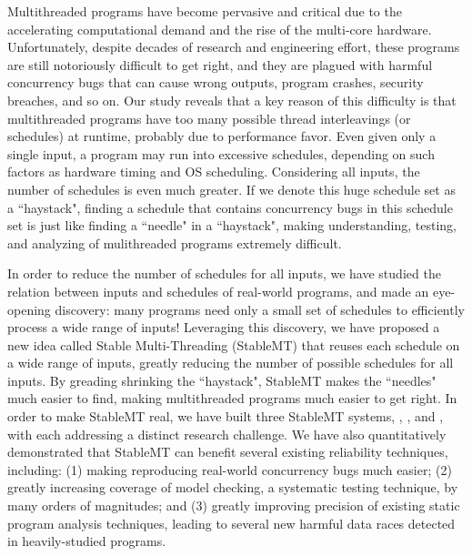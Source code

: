 Multithreaded programs have become pervasive and critical due to the
accelerating computational demand and the rise of the multi-core hardware.
Unfortunately, despite decades of research and engineering effort, these
programs are still notoriously difficult to get right, and they are plagued with
harmful concurrency bugs that can cause wrong outputs, program crashes, security
breaches, and so on. Our study reveals that a key reason of this difficulty is
that multithreaded programs have too many possible thread interleavings (or
schedules) at runtime, probably due to performance favor. Even given only a
single input, a program may run into excessive schedules, depending on such
factors as hardware timing and OS scheduling. Considering all inputs, the number
of schedules is even much greater. If we denote this huge schedule set as a
``haystack", finding a schedule that contains concurrency bugs in this schedule
set is just like finding a ``needle" in a ``haystack", making understanding,
testing, and analyzing of mulithreaded programs extremely difficult.

In order to reduce the number of schedules for all inputs, we have studied the
relation between inputs and schedules of real-world programs, and made an
eye-opening discovery: many programs need only a small set of schedules to
efficiently process a wide range of inputs! Leveraging this discovery, we have
proposed a new idea called Stable Multi-Threading (StableMT) that reuses each
schedule on a wide range of inputs, greatly reducing the number of possible
schedules for all inputs. By greading shrinking the ``haystack", StableMT makes
the ``needles" much easier to find, making multithreaded programs much easier to
get right. In order to make StableMT real, we have built three StableMT systems,
\tern, \peregrine, and \parrot, with each addressing a distinct research
challenge. We have also quantitatively demonstrated that StableMT can benefit
several existing reliability techniques, including: (1) making reproducing
real-world concurrency bugs much easier; (2) greatly increasing coverage of
model checking, a systematic testing technique, by many orders of magnitudes;
and (3) greatly improving precision of existing static program analysis
techniques, leading to several new harmful data races detected in
heavily-studied programs.

